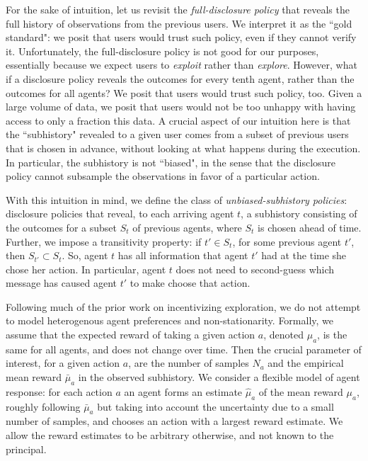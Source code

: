 For the sake of intuition, let us revisit the \emph{full-disclosure policy} that reveals the full history of observations from the previous users. We interpret it as the ``gold standard": we posit that users would trust such policy, even if they cannot verify it. Unfortunately, the full-disclosure policy is not good for our purposes, essentially because we expect users to \emph{exploit} rather than \emph{explore}. However, what if a disclosure policy reveals the outcomes for every tenth agent, rather than the outcomes for all agents? We posit that users would trust such policy, too. Given a large volume of data, we posit that users would not be too unhappy with having access to only a fraction this data. A crucial aspect of our intuition here is that the ``subhistory" revealed to a given user comes from a subset of previous users that is chosen in advance, without looking at what happens during the execution. In particular, the subhistory is not ``biased", in the sense that the disclosure policy cannot subsample the observations in favor of a particular action.

With this intuition in mind, we define the class of \emph{unbiased-subhistory policies}: disclosure policies that reveal, to each arriving agent $t$, a subhistory  consisting of the outcomes for a subset $S_t$ of previous agents, where $S_t$ is chosen ahead of time. Further, we impose a transitivity property: if $t' \in S_t$, for some previous agent $t'$, then $S_{t'}\subset S_t$. So, agent $t$ has all information that agent $t'$ had at the time she chose her action. In particular, agent $t$ does not need to second-guess which message has caused agent $t'$ to make choose that action.

Following much of the prior work on incentivizing exploration, we do not attempt to model heterogenous agent preferences and non-stationarity. Formally, we assume that the expected reward of taking a given action $a$, denoted $\mu_a$, is the same for all agents, and does not change over time. Then the crucial parameter of interest, for a given action $a$, are the number of samples $N_a$ and the empirical mean reward $\bar{\mu}_a$ in the observed subhistory. We consider a flexible model of agent response: for each action $a$ an agent forms an estimate $\hat{\mu}_a$ of the mean reward $\mu_a$, roughly following $\bar{\mu}_a$ but taking into account the uncertainty due to a small number of samples, and chooses an action with a largest reward estimate. We allow the reward estimates to be arbitrary otherwise, and not known to the principal.

